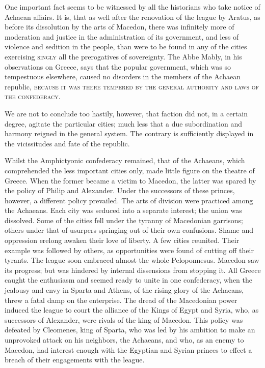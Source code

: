 One important fact seems to be witnessed by all the historians who take notice of Achaean affairs. It is, that as well after the renovation of the league by Aratus, as before its dissolution by the arts of Macedon, there was infinitely more of moderation and justice in the administration of its government, and less of violence and sedition in the people, than were to be found in any of the cities exercising \textsc{singly }all the prerogatives of sovereignty. The Abbe Mably, in his observations on Greece, says that the popular government, which was so tempestuous elsewhere, caused no disorders in the members of the Achaean republic, \textsc{because it was there tempered by the general authority and laws of the confederacy}.

We are not to conclude too hastily, however, that faction did not, in a certain degree, agitate the particular cities; much less that a due subordination and harmony reigned in the general system. The contrary is sufficiently displayed in the vicissitudes and fate of the republic.

Whilst the Amphictyonic confederacy remained, that of the Achaeans, which comprehended the less important cities only, made little figure on the theatre of Greece. When the former became a victim to Macedon, the latter was spared by the policy of Philip and Alexander. Under the successors of these princes, however, a different policy prevailed. The arts of division were practiced among the Achaeans. Each city was seduced into a separate interest; the union was dissolved. Some of the cities fell under the tyranny of Macedonian garrisons; others under that of usurpers springing out of their own confusions. Shame and oppression erelong awaken their love of liberty. A few cities reunited. Their example was followed by others, as opportunities were found of cutting off their tyrants. The league soon embraced almost the whole Peloponnesus. Macedon saw its progress; but was hindered by internal dissensions from stopping it. All Greece caught the enthusiasm and seemed ready to unite in one confederacy, when the jealousy and envy in Sparta and Athens, of the rising glory of the Achaeans, threw a fatal damp on the enterprise. The dread of the Macedonian power induced the league to court the alliance of the Kings of Egypt and Syria, who, as successors of Alexander, were rivals of the king of Macedon. This policy was defeated by Cleomenes, king of Sparta, who was led by his ambition to make an unprovoked attack on his neighbors, the Achaeans, and who, as an enemy to Macedon, had interest enough with the Egyptian and Syrian princes to effect a breach of their engagements with the league.

